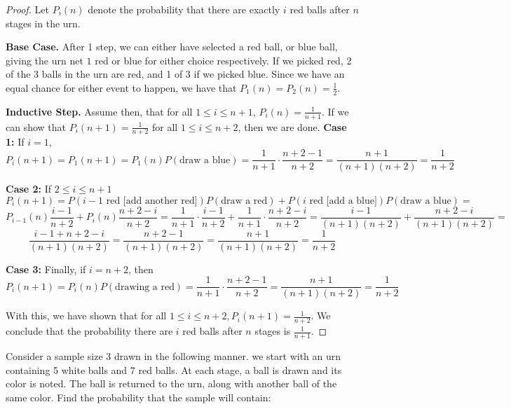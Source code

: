 \documentclass{exam}
\begin{document}
\begin{questions}
\begin{proof}
    \newline
    Let $P_i(n)$ denote the probability that there are exactly $i$ red balls after $n$ stages in the urn.

    \textbf{Base Case.}
    After 1 step, we can either have selected a red ball, or blue ball, giving the urn net $1$ red or blue for either choice respectively. If we picked red, 2 of the 3 balls in the urn are red, and 1 of 3 if we picked blue. Since we have an equal chance for either event to happen, we have that $P_1(n) = P_2(n) = \frac{1}{2}$.

    \newline

    \textbf{Inductive Step.}
    Assume then, that for all $1 \leq i \leq n + 1$, $P_i(n) = \frac{1}{n + 1}$. If we can show that $P_i(n + 1) = \frac{1}{n + 2}$ for all $1 \leq i \leq n + 2$, then we are done. 
    \newline
    \newline
    \textbf{Case 1:} If $i = 1$,
    $$P_i(n + 1) = P_1(n + 1) = P_1(n)P(\text{draw a blue}) = \frac{1}{n + 1} \cdot \frac{n + 2 - 1}{n + 2} = \frac{n + 1}{(n + 1)(n + 2)} = \frac{1}{n + 2}$$
    
    \textbf{Case 2:} If $2 \leq i \leq n + 1$
    $$P_i(n + 1) = P(i - 1 \text{ red [add another red]})P(\text{draw a red}) + P(i \text{ red [add a blue]})P(\text{draw a blue}) =$$
    $$P_{i-1}(n)\frac{i - 1}{n + 2} + P_i(n)\frac{n + 2 - i}{n + 2} = \frac{1}{n + 1} \cdot \frac{i - 1}{n + 2} + \frac{1}{n + 1} \cdot \frac{n + 2 - i}{n + 2} = \frac{i - 1}{(n + 1)(n + 2)} + \frac{n + 2 - i}{(n + 1)(n + 2)} = $$
    $$\frac{i - 1 + n + 2 - i}{(n + 1)(n + 2)} = \frac{n + 2 - 1}{(n + 1)(n + 2)} = \frac{n + 1}{(n + 1)(n + 2)} = \frac{1}{n + 2}$$

    \textbf{Case 3:} Finally, if $i = n + 2$, then
    $$P_i(n + 1) = P_i(n)P(\text{drawing a red}) = \frac{1}{n + 1} \cdot \frac{n + 2 - 1}{n + 2} = \frac{n + 1}{(n + 1)(n + 2)} = \frac{1}{n + 2}$$

    With this, we have shown that for all $1 \leq i \leq n + 2, P_i(n + 1) = \frac{1}{n + 2}$. We conclude that the probability there are $i$ red balls after $n$ stages is $\frac{1}{n + 1}$.
\end{proof}



\newpage
\question
Consider a sample size 3 drawn in the following manner. we start with an urn containing 5 white balls and 7 red balls. At each stage, a ball is drawn and its color is noted. The ball is returned to the urn, along with another ball of the same color. Find the probability that the sample will contain:


\end{questions}
\end{document}
